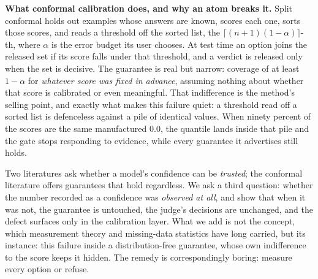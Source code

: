 \documentclass{article}
\begin{document}
\textbf{What conformal calibration does, and why an atom breaks it.} Split
conformal holds out examples whose answers are known, scores each one, sorts
those scores, and reads a threshold off the sorted list, the $\lceil(n{+}1)(1{-}\alpha)\rceil$-th, where $\alpha$ is the error budget its
user chooses. At test time an option joins the released set if its score falls
under that threshold, and a verdict is released only when the set is decisive.
The guarantee is real but narrow: coverage of at least $1-\alpha$ for
\emph{whatever score was fixed in advance}, assuming nothing about whether that
score is calibrated or even meaningful. That indifference is the method's
selling point, and exactly what makes this failure quiet: a threshold read off a sorted list is defenceless against a pile of identical values. When ninety
percent of the scores are the same manufactured $0.0$, the quantile lands inside
that pile and the gate stops responding to evidence, while every guarantee it
advertises still holds.

Two literatures ask whether a model's confidence can be \emph{trusted}; the
conformal literature offers guarantees that hold regardless. We ask a third question: whether the number recorded as a confidence was \emph{observed at all}, and show that when it was not, the guarantee is untouched, the judge's
decisions are unchanged, and the defect surfaces only in the calibration layer.
What we add is not the concept, which measurement theory and missing-data
statistics have long carried, but its instance: this failure inside a
distribution-free guarantee, whose own indifference to the score keeps it hidden.
The remedy is correspondingly boring: measure every option or refuse.
\end{document}
